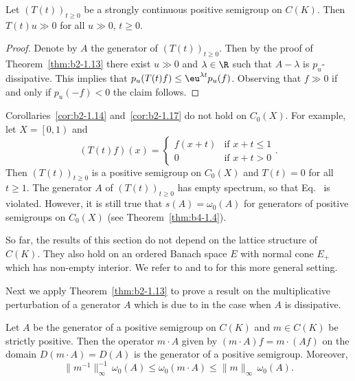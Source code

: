 \begin{corollary}\label{cor:b2-1.17}
Let $(T(t))_{t \geq 0}$ be a strongly continuous positive semigroup on $C(K)$.
Then $T(t)u \gg 0$ for all $u \gg 0$, $t \geq 0$.
\end{corollary}
\begin{proof}
Denote by $A$ the generator of\/ $(T(t))_{t \geq 0}$.
Then by the proof of Theorem~\ref{thm:b2-1.13} there exist $u \gg 0$ and $\lambda \in \R$ such that $A - \lambda$ is $p_{u}$-dissipative.
This implies that $p_{u}(T(t)f) \leq \eu^{\lambda t}p_{u}(f)$.
Observing that $f \gg 0$ if and only if\/ $p_{u}(-f) < 0$ the claim follows.
\end{proof}
\begin{remark}\label{rem:b2-1.18}
Corollaries~\ref{cor:b2-1.14} and~\ref{cor:b2-1.17} do not hold on $C_{0}(X)$.
For example, let $X = \left[0,1\right)$ and
\[
    (T(t)f)(x) = \begin{cases}
        f(x+t) & \text{if } x+t \leq 1 \\
        0 & \text{if } x+t > 0
    \end{cases}.
\]
Then $(T(t))_{t \geq 0}$ is a positive semigroup on $C_{0}(X)$ and $T(t) = 0$ for all $t \geq 1$.
The generator $A$ of\/ $(T(t))_{t \geq 0}$ has empty spectrum, so that Eq.~ is violated.
However, it is still true that $s(A) = \omega_{0}(A)$ for generators of positive semigroups on $C_{0}(X)$ (see Theorem~\ref{thm:b4-1.4}).
\end{remark}
\begin{remark}\label{rem:b2-1.19}
So far, the results of this section do not depend on the lattice structure of\/ $C(K)$.
They also hold on an ordered Banach space $E$ with normal cone $E_{+}$ which has non-empty interior.
We refer to \textcite{arendtchernoffkato:1982} and to \textcite{battyrobinson:1984} for this more general setting.
\end{remark}
Next we apply Theorem~\ref{thm:b2-1.13} to prove a result on the multiplicative perturbation of a generator $A$ which is due to \textcite{dorroh:1966} in the case when $A$ is dissipative.
\begin{theorem}\label{thm:b2-1.20}
Let $A$ be the generator of a positive semigroup on $C(K)$ and  $m \in C(K)$ be strictly positive.
Then the operator $m \cdot A$ given by $(m \cdot A)f = m \cdot (Af)$ on the domain $D(m \cdot A) = D(A)$ is the generator of a positive semigroup.
Moreover,
\begin{equation}\label{eq:b2-1.10}
\|m^{-1}\|_{\infty}^{-1}\, \omega_{0}(A) \leq \omega_{0}(m \cdot A) \leq \|m\|_{\infty}\, \omega_{0}(A).
\end{equation}
\end{theorem}
